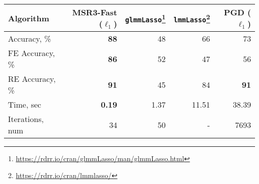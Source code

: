 \begin{tabular}{lrrrr}
\toprule
Algorithm &        MSR3-Fast ($\ell_1$)&         \texttt{glmmLasso}\footnote{\href{https://rdrr.io/cran/glmmLasso/man/glmmLasso.html}{https://rdrr.io/cran/glmmLasso/man/glmmLasso.html}} \cite{groll2014variable}  &            \texttt{lmmLasso}\footnote{\href{https://rdrr.io/cran/lmmlasso/}{https://rdrr.io/cran/lmmlasso/}}\cite{schelldorfer2011estimation} & PGD ($\ell_1$) \\
\midrule
Accuracy, \% &     {\bf 88} &        48 &          66 & 73  \\
FE Accuracy, \% &      {\bf 86} &        52  &          47 & 56\\
RE Accuracy, \% &     {\bf 91} &        45  &         84 & {\bf 91} \\
Time, sec        & {\bf 0.19} &  1.37  &  11.51 & 38.39 \\
Iterations, num  &      34 &        50 &             - & 7693 \\
\bottomrule
\end{tabular}